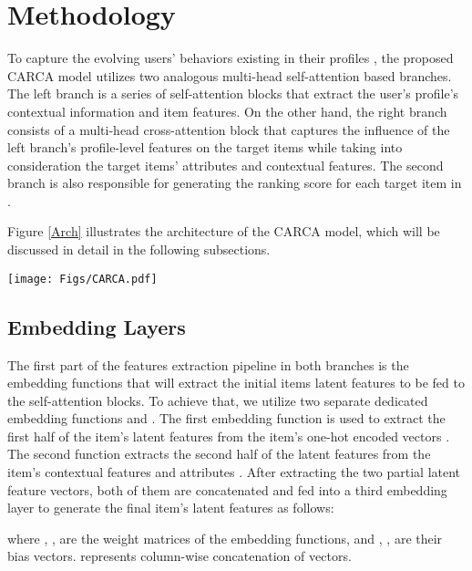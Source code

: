 \documentclass[sigconf,natbib=true]{acmart}
\begin{document}
\section{Methodology}
To capture the evolving users' behaviors existing in their profiles , the proposed CARCA model utilizes two analogous multi-head self-attention based branches. The left branch is a series of self-attention blocks that extract the user's profile's contextual information and item features. On the other hand, the right branch consists of a multi-head cross-attention block that captures the influence of the left branch's profile-level features on the target items  while taking into consideration the target items' attributes and contextual features. The second branch is also responsible for generating the ranking score for each target item in .

Figure \ref{Arch} illustrates the architecture of the CARCA model, which will be discussed in detail in the following subsections.

\begin{figure*}[!ht]
\centering
\texttt{[image: Figs/CARCA.pdf]}
\caption{Illustration of the CARCA model, which is composed of two main branches, namely the profile-level features extraction branch on the left and the target items cross-attention scoring branch on the right.}
\label{Arch}
\end{figure*}


\subsection{Embedding Layers}
The first part of the features extraction pipeline in both branches is the embedding functions that will extract the initial items latent features to be fed to the self-attention blocks. To achieve that, we utilize two separate dedicated embedding functions  and . The first embedding function  is used to extract the first half of the item's latent features  from the item's one-hot encoded vectors . The second function  extracts the second half of the latent features  from the item's contextual features  and attributes . After extracting the two partial latent feature vectors, both of them are concatenated and fed into a third embedding layer  to generate the final item's latent features  as follows:


 

 

 



\noindent where , ,  are the weight matrices of the embedding functions, and , ,  are their bias vectors.  represents column-wise concatenation of vectors.
\end{document}
